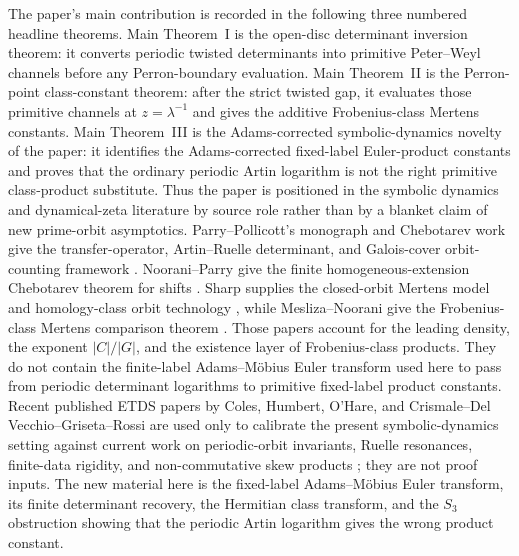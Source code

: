 The paper's main contribution is recorded in the following three numbered
headline theorems.  Main Theorem~I is the open-disc determinant
inversion theorem: it converts periodic twisted determinants into primitive
Peter--Weyl channels before any Perron-boundary evaluation.  Main
Theorem~II is the Perron-point class-constant theorem: after the strict
twisted gap, it evaluates those primitive channels at
\(z=\lambda^{-1}\) and gives the additive Frobenius-class Mertens constants.
Main Theorem~III is the Adams-corrected symbolic-dynamics novelty of the paper:
it identifies the Adams-corrected fixed-label Euler-product constants and
proves that the ordinary periodic Artin logarithm is not the right primitive
class-product substitute.  Thus the paper is positioned in the symbolic
dynamics and dynamical-zeta literature by source role rather than by a blanket
claim of new prime-orbit asymptotics.  Parry--Pollicott's monograph and
Chebotarev work give the transfer-operator, Artin--Ruelle determinant, and
Galois-cover orbit-counting framework
\cite{ParryPollicott1990Zeta,ParryPollicott1986Chebotarev}.  Noorani--Parry
give the finite homogeneous-extension Chebotarev theorem for shifts
\cite{NooraniParry1992ChebotarevShifts}.  Sharp supplies the closed-orbit
Mertens model and homology-class orbit technology
\cite{Sharp1991Mertens,Sharp1993ClosedOrbitsHomologyAnosov}, while
Mesliza--Noorani give the Frobenius-class Mertens comparison theorem
\cite{MeslizaNoorani1999FrobeniusMertens}.  Those papers account for the
leading density, the exponent \(|C|/|G|\), and the existence layer of
Frobenius-class products.  They do not contain the finite-label
Adams--M\"obius Euler transform used here to pass from periodic determinant
logarithms to primitive fixed-label product constants.  Recent published ETDS papers by Coles, Humbert, O'Hare, and
Crismale--Del Vecchio--Griseta--Rossi are used only to calibrate the present
symbolic-dynamics setting against current work on periodic-orbit invariants,
Ruelle resonances, finite-data rigidity, and non-commutative skew products
\cite{Coles2025VassilievWritheAxiomA,Humbert2025FirstRuelleResonance,OHare2025FiniteDataRigidity,CrismaleDelVecchioGrisetaRossi2025NoncommutativeSkewProduct};
they are not proof inputs.  The new material here is the fixed-label
Adams--M\"obius Euler transform, its finite determinant recovery, the
Hermitian class transform, and the \(S_3\) obstruction showing that the
periodic Artin logarithm gives the wrong product constant.

